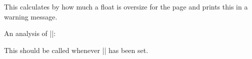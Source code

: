     \begin{teX}
      \@minipagefalse   
      \outer@nobreak
    \egroup                  %
}
     \end{teX}

% 
 \begin{macro}{\outer@nobreak}
    \begin{teX}
\let\outer@nobreak\@empty
    \end{teX}
  \end{macro}
 

  \begin{macro}{\@largefloatcheck}
  \end{macro}
    This calculates by how much a float is oversize for the page and
    prints this in a warning message.
    
    \begin{teX}  
\def \@largefloatcheck{%
  \ifdim \ht\@currbox>\textheight
    \@tempdima -\textheight
    \advance \@tempdima \ht\@currbox
    \end{teX}

    \begin{teX}
    \@latex@warning {Float too large for page by \the\@tempdima}%
    \ht\@currbox \textheight
  \fi
}
    \end{teX}
 

  \begin{macro}{\@dbflt}
  \begin{macro}{\@xdblfloat}
    \begin{teX}
\def\@dbflt#1{\@ifnextchar[{\@xdblfloat{#1}}{\@xdblfloat{#1}[tp]}}
\def\@xdblfloat#1[#2]{%
  \@xfloat{#1}[#2]\hsize\textwidth\linewidth\textwidth}
    \end{teX}
  \end{macro}
  \end{macro}

    \begin{teX}
\newcount\c@topnumber
\newcount\c@dbltopnumber
\newcount\c@bottomnumber
\newcount\c@totalnumber
    \end{teX}


 An analysis of |\@floatplacement|:

 This should be called whenever |\@colht| has been set.
    \begin{teX}
\def\@floatplacement{\global\@topnum\c@topnumber
   \global\@toproom \topfraction\@colht
   \global\@botnum  \c@bottomnumber
   \global\@botroom \bottomfraction\@colht
   \global\@colnum  \c@totalnumber
   \@fpmin   \floatpagefraction\@colht}
    \end{teX}


